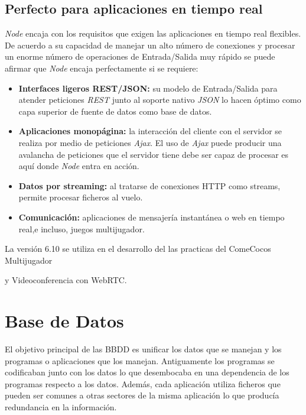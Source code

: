{\subsection*{Perfecto para aplicaciones en tiempo real}
\textit{Node} encaja con los requisitos que exigen las aplicaciones en tiempo real flexibles. De acuerdo a su capacidad de manejar un alto número de conexiones y procesar un enorme número de operaciones de Entrada/Salida muy rápido se puede afirmar que \textit{Node} encaja perfectamente si se requiere:
\begin{itemize}
\item \textbf{Interfaces ligeros REST/JSON:} su modelo de Entrada/Salida para atender peticiones \textit{REST} junto al soporte nativo \textit{JSON} lo hacen óptimo como capa superior de fuente de datos como base de datos.
\item \textbf{Aplicaciones monopágina:} la interacción del cliente con el servidor se realiza por medio de peticiones \textit{Ajax}. El uso de \textit{Ajax} puede producir una avalancha de peticiones que el servidor tiene debe ser capaz de procesar es aquí donde \textit{Node} entra en acción.
\item \textbf{Datos por streaming:} al tratarse de conexiones HTTP como streams, permite procesar ficheros al vuelo.
\item \textbf{Comunicación:} aplicaciones de mensajería instantánea o web en tiempo real,e incluso, juegos multijugador.
\end{itemize}
La versión 6.10 se utiliza en el desarrollo del las practicas del ComeCocos Multijugador} y Videoconferencia con WebRTC.
\section{Base de Datos}
El objetivo principal de las BBDD \cite{bbdd} es unificar los datos que se manejan y los programas o aplicaciones que los manejan. Antiguamente los programas se codificaban junto con los datos lo que desembocaba en una dependencia de los programas respecto a los datos. Además, cada aplicación utiliza ficheros que pueden ser comunes a otras sectores de la misma aplicación lo que producía redundancia en la información.

